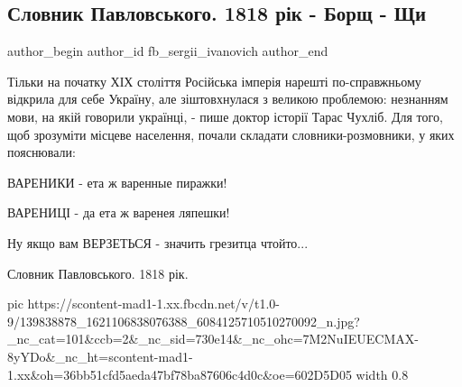  
 
 
 
 
\subsection{Словник Павловського. 1818 рік - Борщ - Щи}
\label{sec:19_01_2021.fb.sergii_ivanovich.1.slova}
\ifcmt
  author_begin
   author_id fb_sergii_ivanovich
  author_end
\fi

Тільки на початку ХІХ століття Російська імперія нарешті по-справжньому
відкрила для себе Україну, але зіштовхнулася з великою проблемою: незнанням
мови, на якій говорили українці, - пише доктор історії Тарас Чухліб. Для того,
щоб зрозуміти місцеве населення, почали складати словники-розмовники, у яких
пояснювали:

ВАРЕНИКИ - ета ж варенные пиражки!

ВАРЕНИЦІ - да ета ж варенея ляпешки!

Ну якщо вам ВЕРЗЕТЬСЯ - значить грезитца чтойто...

Словник Павловського. 1818 рік.

\ifcmt
  pic https://scontent-mad1-1.xx.fbcdn.net/v/t1.0-9/139838878_1621106838076388_6084125710510270092_n.jpg?_nc_cat=101&ccb=2&_nc_sid=730e14&_nc_ohc=7M2NuIEUECMAX-8yYDo&_nc_ht=scontent-mad1-1.xx&oh=36bb51cfd5aeda47bf78ba87606c4d0c&oe=602D5D05
  width 0.8
\fi

